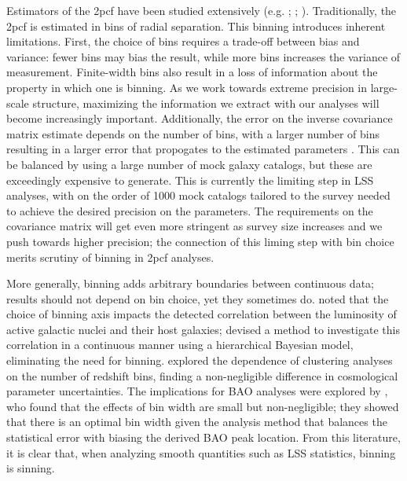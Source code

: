 \documentclass[modern]{aastex62}
\newcommand{\cf}{2pcf\xspace} %
\begin{document}
Estimators of the \cf have been studied extensively (e.g. \citealt{PeeblesHauser1974}; \citealt{DavisPeebles1983}; \citealt{Hamilton1993}).
Traditionally, the \cf is estimated in bins of radial separation.
This binning introduces inherent limitations.
First, the choice of bins requires a trade-off between bias and variance: fewer bins may bias the result, while more bins increases the variance of measurement.
Finite-width bins also result in a loss of information about the property in which one is binning.
As we work towards extreme precision in large-scale structure, maximizing the information we extract with our analyses will become increasingly important.
Additionally, the error on the inverse covariance matrix estimate depends on the number of bins, with a larger number of bins resulting in a larger error that propogates to the estimated parameters \citep{Hartlap2007, Percival2014}.
This can be balanced by using a large number of mock galaxy catalogs, but these are exceedingly expensive to generate.
This is currently the limiting step in LSS analyses, with on the order of 1000 mock catalogs tailored to the survey needed to achieve the desired precision on the parameters.
The requirements on the covariance matrix will get even more stringent as survey size increases and we push towards higher precision; the connection of this liming step with bin choice merits scrutiny of binning in \cf analyses.

More generally, binning adds arbitrary boundaries between continuous data; results should not depend on bin choice, yet they sometimes do.
\cite{Lanzuisi2017} noted that the choice of binning axis impacts the detected correlation between the luminosity of active galactic nuclei and their host galaxies; \cite{Grimmett2020} devised a method to investigate this correlation in a continuous manner using a hierarchical Bayesian model, eliminating the need for binning.
\cite{Bailoni2016} explored the dependence of clustering analyses on the number of redshift bins, finding a non-negligible difference in cosmological parameter uncertainties.
The implications for BAO analyses were explored by \cite{Percival2014}, who found that the effects of bin width are small but non-negligible; they showed that there is an optimal bin width given the analysis method that balances the statistical error with biasing the derived BAO peak location.
From this literature, it is clear that, when analyzing smooth quantities such as LSS statistics, binning is sinning.
\end{document}
